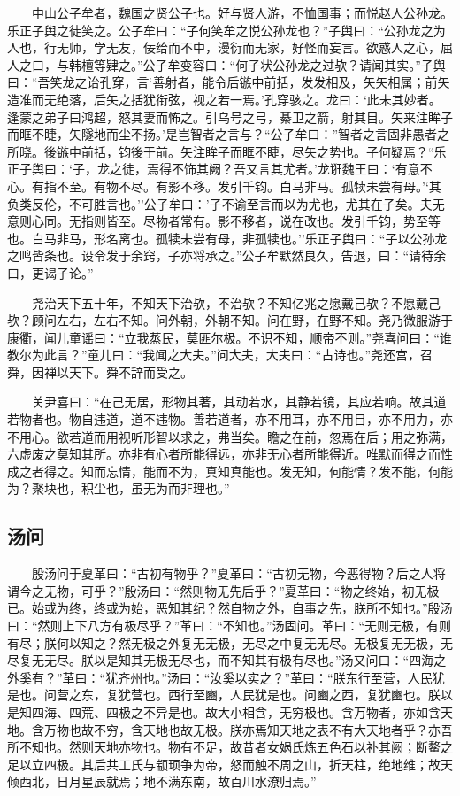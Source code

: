 　　中山公子牟者，魏国之贤公子也。好与贤人游，不恤国事；而悦赵人公孙龙。乐正子舆之徒笑之。公子牟曰：``子何笑牟之悦公孙龙也？''子舆曰：``公孙龙之为人也，行无师，学无友，佞给而不中，漫衍而无家，好怪而妄言。欲惑人之心，屈人之口，与韩檀等肄之。''公子牟变容曰：``何子状公孙龙之过欤？请闻其实。''子舆曰：``吾笑龙之诒孔穿，言`善射者，能令后镞中前括，发发相及，矢矢相属；前矢造准而无绝落，后矢之括犹衔弦，视之若一焉。'孔穿骇之。龙曰：`此未其妙者。逢蒙之弟子曰鸿超，怒其妻而怖之。引乌号之弓，綦卫之箭，射其目。矢来注眸子而眶不睫，矢隧地而尘不扬。'是岂智者之言与？``公子牟曰：''智者之言固非愚者之所晓。後镞中前括，钧後于前。矢注眸子而眶不睫，尽矢之势也。子何疑焉？``乐正子舆曰：`子，龙之徒，焉得不饰其阙？吾又言其尤者。'龙诳魏王曰：`有意不心。有指不至。有物不尽。有影不移。发引千钧。白马非马。孤犊未尝有母。'`其负类反伦，不可胜言也。''公子牟曰：'子不谕至言而以为尤也，尤其在子矣。夫无意则心同。无指则皆至。尽物者常有。影不移者，说在改也。发引千钧，势至等也。白马非马，形名离也。孤犊未尝有母，非孤犊也。''乐正子舆曰：``子以公孙龙之鸣皆条也。设令发于余窍，子亦将承之。''公子牟默然良久，告退，曰：``请待余曰，更谒子论。''

　　尧治天下五十年，不知天下治欤，不治欤？不知亿兆之愿戴己欤？不愿戴己欤？顾问左右，左右不知。问外朝，外朝不知。问在野，在野不知。尧乃微服游于康衢，闻儿童谣曰：``立我蒸民，莫匪尔极。不识不知，顺帝不则。''尧喜问曰：``谁教尔为此言？''童儿曰：``我闻之大夫。''问大夫，大夫曰：``古诗也。''尧还宫，召舜，因禅以天下。舜不辞而受之。

　　关尹喜曰：``在己无居，形物其著，其动若水，其静若镜，其应若响。故其道若物者也。物自违道，道不违物。善若道者，亦不用耳，亦不用目，亦不用力，亦不用心。欲若道而用视听形智以求之，弗当矣。瞻之在前，忽焉在后；用之弥满，六虚废之莫知其所。亦非有心者所能得远，亦非无心者所能得近。唯默而得之而性成之者得之。知而忘情，能而不为，真知真能也。发无知，何能情？发不能，何能为？聚块也，积尘也，虽无为而非理也。''

\hypertarget{ux6c64ux95ee}{%
\subsection{汤问}\label{ux6c64ux95ee}}

　　殷汤问于夏革曰：``古初有物乎？''夏革曰：``古初无物，今恶得物？后之人将谓今之无物，可乎？''殷汤曰：``然则物无先后乎？''夏革曰：``物之终始，初无极已。始或为终，终或为始，恶知其纪？然自物之外，自事之先，朕所不知也。''殷汤曰：``然则上下八方有极尽乎？''革曰：``不知也。''汤固问。革曰：``无则无极，有则有尽；朕何以知之？然无极之外复无无极，无尽之中复无无尽。无极复无无极，无尽复无无尽。朕以是知其无极无尽也，而不知其有极有尽也。''汤又问曰：``四海之外奚有？''革曰：``犹齐州也。''汤曰：``汝奚以实之？''革曰：``朕东行至营，人民犹是也。问营之东，复犹营也。西行至豳，人民犹是也。问豳之西，复犹豳也。朕以是知四海、四荒、四极之不异是也。故大小相含，无穷极也。含万物者，亦如含天地。含万物也故不穷，含天地也故无极。朕亦焉知天地之表不有大天地者乎？亦吾所不知也。然则天地亦物也。物有不足，故昔者女娲氏炼五色石以补其阙；断鳌之足以立四极。其后共工氏与颛顼争为帝，怒而触不周之山，折天柱，绝地维；故天倾西北，日月星辰就焉；地不满东南，故百川水潦归焉。''

